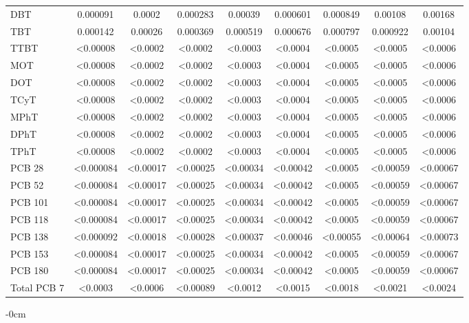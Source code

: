 \documentclass[algorithms,article,submit,pdftex,moreauthors]{Definitions/mdpi}
\begin{document}
\begin{scriptsize}
\begin{center}
\begin{longtable}{@{\extracolsep{\fill}}|p{1.8cm}|cccccccc|@{}}
DBT & 0.000091 & 0.0002 & 0.000283 & 0.00039 & 0.000601 & 0.000849 & 0.00108 & 0.00168 \\
TBT & 0.000142 & 0.00026 & 0.000369 & 0.000519 & 0.000676 & 0.000797 & 0.000922 & 0.00104 \\
TTBT & <0.00008 & <0.0002 & <0.0002 & <0.0003 & <0.0004 & <0.0005 & <0.0005 & <0.0006 \\
MOT & <0.00008 & <0.0002 & <0.0002 & <0.0003 & <0.0004 & <0.0005 & <0.0005 & <0.0006 \\
DOT & <0.00008 & <0.0002 & <0.0002 & <0.0003 & <0.0004 & <0.0005 & <0.0005 & <0.0006 \\
TCyT & <0.00008 & <0.0002 & <0.0002 & <0.0003 & <0.0004 & <0.0005 & <0.0005 & <0.0006 \\
MPhT & <0.00008 & <0.0002 & <0.0002 & <0.0003 & <0.0004 & <0.0005 & <0.0005 & <0.0006 \\
DPhT & <0.00008 & <0.0002 & <0.0002 & <0.0003 & <0.0004 & <0.0005 & <0.0005 & <0.0006 \\
TPhT & <0.00008 & <0.0002 & <0.0002 & <0.0003 & <0.0004 & <0.0005 & <0.0005 & <0.0006 \\
PCB 28 & <0.000084 & <0.00017 & <0.00025 & <0.00034 & <0.00042 & <0.0005 & <0.00059 & <0.00067 \\
PCB 52 & <0.000084 & <0.00017 & <0.00025 & <0.00034 & <0.00042 & <0.0005 & <0.00059 & <0.00067 \\
PCB 101 & <0.000084 & <0.00017 & <0.00025 & <0.00034 & <0.00042 & <0.0005 & <0.00059 & <0.00067 \\
PCB 118 & <0.000084 & <0.00017 & <0.00025 & <0.00034 & <0.00042 & <0.0005 & <0.00059 & <0.00067 \\
PCB 138 & <0.000092 & <0.00018 & <0.00028 & <0.00037 & <0.00046 & <0.00055 & <0.00064 & <0.00073 \\
PCB 153 & <0.000084 & <0.00017 & <0.00025 & <0.00034 & <0.00042 & <0.0005 & <0.00059 & <0.00067 \\
PCB 180  & <0.000084 & <0.00017 & <0.00025 & <0.00034 & <0.00042 & <0.0005 & <0.00059 & <0.00067 \\
Total PCB 7 & <0.0003 & <0.0006 & <0.00089 & <0.0012 & <0.0015 & <0.0018 & <0.0021 & <0.0024 \\
%
\end{longtable}
\end{center}
\end{scriptsize}

\begin{adjustwidth}{-\extralength}{0cm}




\end{adjustwidth}
\end{document}

